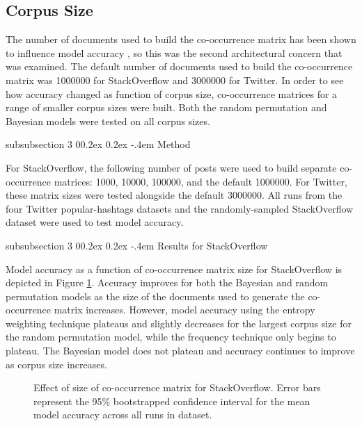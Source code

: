 \documentclass[man,floatsintext,donotrepeattitle]{apa6}
\makeatletter
\renewcommand{\subsubsection}{%
  \@startsection
  {subsubsection}%
  {3}%
  {\parindent}%
  {0\baselineskip \@plus 0.2ex \@minus 0.2ex}%
  {-.4em}%
  {\normalfont\normalsize\bfseries\addperi}}
\makeatother
\begin{document}
\subsection{Corpus Size}

The number of documents used to build the co-occurrence matrix has been shown to influence model accuracy \parencite{Sahlgren2008}, so this was the second architectural concern that was examined.
The default number of documents used to build the co-occurrence matrix was \num{1000000} for StackOverflow and \num{3000000} for Twitter.
In order to see how accuracy changed as function of corpus size, 
co-occurrence matrices for a range of smaller corpus sizes were built.
Both the random permutation and Bayesian models were tested on all corpus sizes.

\subsubsection{Method}

For StackOverflow, the following number of posts were used to build separate co-occurrence matrices: \num{1000}, \num{10000}, \num{100000}, and the default \num{1000000}.
For Twitter, these matrix sizes were tested alongside the default \num{3000000}.
All runs from the four Twitter popular-hashtags datasets and the randomly-sampled StackOverflow dataset were used to test model accuracy.

\subsubsection{Results for StackOverflow}

Model accuracy as a function of co-occurrence matrix size for StackOverflow is depicted in Figure \ref{figContextDocumentSizeSO}.
Accuracy improves for both the Bayesian and random permutation models as the size of the documents used to generate the co-occurrence matrix increases.
However, model accuracy using the entropy weighting technique plateaus and slightly decreases for the largest corpus size for the random permutation model, while the frequency technique only begins to plateau. 
The Bayesian model does not plateau and accuracy continues to improve as corpus size increases.

\begin{figure}[!htbp]
  \caption{
    Effect of size of co-occurrence matrix for StackOverflow.
    Error bars represent the 95\% bootstrapped confidence interval for the mean model accuracy across all runs in dataset.
  }
  \label{figContextDocumentSizeSO}
\end{figure}
\end{document}
